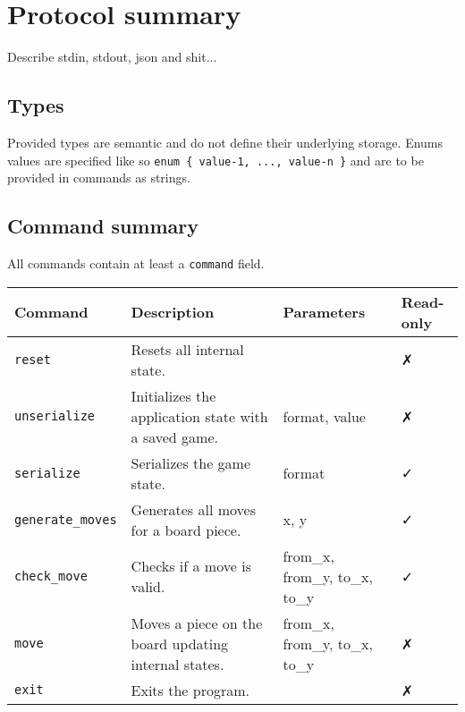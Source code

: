 \section{Protocol summary}

Describe stdin, stdout, json and shit...

\subsection{Types}


Provided types are semantic and do not define their underlying storage. Enums values are specified like so \texttt{enum \{ value-1, ..., value-n \}} and are to be provided in commands as strings.

\subsection{Command summary}

All commands contain at least a \texttt{command} field.

\begin{center}
\begin{tabu} to\linewidth {X[l, -2] | X[l, 4] | X[l, -1] | X[c, -1]}
    Command
        & Description
        & Parameters
        & Read-only \\ \hline \hline
    \texttt{reset}
        & Resets all internal state.
        &
        & \faClose{} \\
    \texttt{unserialize}
        & Initializes the application state with a saved game.
        & format, value
        & \faClose{} \\
    \texttt{serialize}
        & Serializes the game state.
        & format
        & \faCheck{} \\
    \texttt{generate\_moves}
        & Generates all moves for a board piece.
        & x, y
        & \faCheck{} \\
    \texttt{check\_move}
        & Checks if a move is valid.
        & from\_x, from\_y, to\_x, to\_y
        & \faCheck{} \\
    \texttt{move}
        & Moves a piece on the board updating internal states.
        & from\_x, from\_y, to\_x, to\_y
        & \faClose{} \\
    \texttt{exit}
        & Exits the program.
        &
        & \faClose{} \\
\end{tabu}
\end{center}


